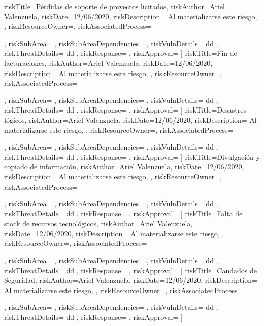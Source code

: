 riskTitle={Pérdidas de soporte de proyectos licitados},
    riskAuthor={Ariel Valenzuela},
    riskDate={12/06/2020},
    riskDescription={ Al materializarse este riesgo,  },
    riskResourceOwner={},
    riskAssociatedProcess={
        
    },
    riskSubArea={ 
        \riskSubAreaAll
    },
    riskSubAreaDependencies={   },
    riskVulnDetails={
        dd
    },
    riskThreatDetails={
        dd
    },
    riskResponse={ },
    riskApproval={  }
]{}
riskTitle={Fin de facturaciones},
    riskAuthor={Ariel Valenzuela},
    riskDate={12/06/2020},
    riskDescription={ Al materializarse este riesgo,  },
    riskResourceOwner={},
    riskAssociatedProcess={
        
    },
    riskSubArea={ 
        \riskSubAreaAll
    },
    riskSubAreaDependencies={   },
    riskVulnDetails={
        dd
    },
    riskThreatDetails={
        dd
    },
    riskResponse={ },
    riskApproval={  }
]{}
riskTitle={Desastres lógicos},
    riskAuthor={Ariel Valenzuela},
    riskDate={12/06/2020},
    riskDescription={ Al materializarse este riesgo,  },
    riskResourceOwner={},
    riskAssociatedProcess={
        
    },
    riskSubArea={ 
        \riskSubAreaAll
    },
    riskSubAreaDependencies={   },
    riskVulnDetails={
        dd
    },
    riskThreatDetails={
        dd
    },
    riskResponse={ },
    riskApproval={  }
]{}
riskTitle={Divulgación y copiado de información},
    riskAuthor={Ariel Valenzuela},
    riskDate={12/06/2020},
    riskDescription={ Al materializarse este riesgo,  },
    riskResourceOwner={},
    riskAssociatedProcess={
        
    },
    riskSubArea={ 
        \riskSubAreaAll
    },
    riskSubAreaDependencies={   },
    riskVulnDetails={
        dd
    },
    riskThreatDetails={
        dd
    },
    riskResponse={ },
    riskApproval={  }
]{}
riskTitle={Falta de stock de recursos tecnológicos},
    riskAuthor={Ariel Valenzuela},
    riskDate={12/06/2020},
    riskDescription={ Al materializarse este riesgo,  },
    riskResourceOwner={},
    riskAssociatedProcess={
        
    },
    riskSubArea={ 
        \riskSubAreaAll
    },
    riskSubAreaDependencies={   },
    riskVulnDetails={
        dd
    },
    riskThreatDetails={
        dd
    },
    riskResponse={ },
    riskApproval={  }
]{}
riskTitle={Candados de Seguridad},
    riskAuthor={Ariel Valenzuela},
    riskDate={12/06/2020},
    riskDescription={ Al materializarse este riesgo,  },
    riskResourceOwner={},
    riskAssociatedProcess={
        
    },
    riskSubArea={ 
        \riskSubAreaAll
    },
    riskSubAreaDependencies={   },
    riskVulnDetails={
        dd
    },
    riskThreatDetails={
        dd
    },
    riskResponse={ },
    riskApproval={  }
]{}

